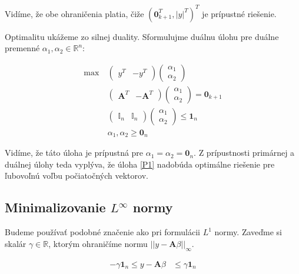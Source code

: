 \documentclass[report.tex]{subfiles}
\begin{document}
Vidíme, že obe ohraničenia platia, čiže $\left(\mathbf{0}_{k+1}^T, |y|^T \right)^T$ je prípustné riešenie.

Optimalitu ukážeme zo silnej duality. Sformulujme duálnu úlohu pre duálne premenné $\alpha_1, \alpha_2 \in \mathbb{R}^{n}$:

\begin{align*}
	\text{max}~ &
	\left(
		\begin{array}{c|c}
			y^T & -y^T
		\end{array}
	\right)
	\left(
		\begin{array}{c}
			\alpha_1 \\
			\hline
			\alpha_2
		\end{array}
	\right) \\
	&\left(
		\begin{array}{c|c}
			\mathbf{A}^T & -\mathbf{A}^T
		\end{array}
	\right)
	\left(
		\begin{array}{c}
			\alpha_1 \\
			\hline
			\alpha_2
		\end{array}
	\right)
	=
	\mathbf{0}_{k+1} \\
	&\left(
		\begin{array}{c|c}
			\mathbb{I}_n & \mathbb{I}_n
		\end{array}
	\right)
	\left(
		\begin{array}{c}
			\alpha_1 \\
			\hline
			\alpha_2
		\end{array}
	\right)
	\leq
	\mathbf{1}_{n} \\
	&\alpha_1, \alpha_2 \geq \mathbf{0}_{n} 
\end{align*}

Vidíme, že táto úloha je prípustná pre $\alpha_1 = \alpha_2 = \mathbf{0}_n$. Z prípustnosti primárnej a duálnej úlohy teda vyplýva, že úloha \eqref{P1} nadobúda optimálne riešenie pre ľubovoľnú voľbu počiatočných vektorov.

\subsection{Minimalizovanie $L^{\infty}$ normy}

Budeme používať podobné značenie ako pri formulácii $L^1$ normy. Zaveďme si skalár $\gamma \in \mathbb{R}$, ktorým ohraničíme normu $||y - \mathbf{A} \beta||_{\infty}$.

\begin{align*}
	-\gamma \mathbf{1}_n \leq y - \mathbf{A} \beta &\leq \gamma \mathbf{1}_n
\end{align*}
\end{document}
